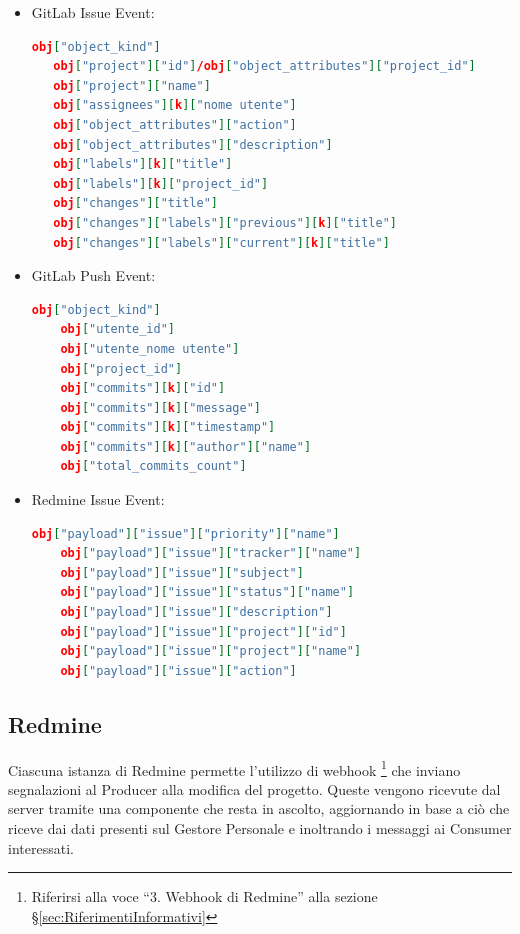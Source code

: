     \begin{itemize}

            \item GitLab Issue Event:
        \begin{lstlisting}[language = json]
   obj["object_kind"]
   obj["project"]["id"]/obj["object_attributes"]["project_id"]
   obj["project"]["name"]
   obj["assignees"][k]["nome utente"]
   obj["object_attributes"]["action"]
   obj["object_attributes"]["description"]
   obj["labels"][k]["title"]
   obj["labels"][k]["project_id"]
   obj["changes"]["title"]
   obj["changes"]["labels"]["previous"][k]["title"]
   obj["changes"]["labels"]["current"][k]["title"]
        \end{lstlisting}

            \item GitLab Push Event:
        \begin{lstlisting}[language = json]
    obj["object_kind"]
    obj["utente_id"]
    obj["utente_nome utente"]
    obj["project_id"]
    obj["commits"][k]["id"]
    obj["commits"][k]["message"]
    obj["commits"][k]["timestamp"]
    obj["commits"][k]["author"]["name"]
    obj["total_commits_count"]
        \end{lstlisting}

            \item Redmine Issue Event:
        \begin{lstlisting}[language = json]
    obj["payload"]["issue"]["priority"]["name"]
    obj["payload"]["issue"]["tracker"]["name"]
    obj["payload"]["issue"]["subject"]
    obj["payload"]["issue"]["status"]["name"]
    obj["payload"]["issue"]["description"]
    obj["payload"]["issue"]["project"]["id"]
    obj["payload"]["issue"]["project"]["name"]
    obj["payload"]["issue"]["action"]
        \end{lstlisting}
    \end{itemize}

		\subsection{Redmine}
		Ciascuna istanza di Redmine permette l'utilizzo di webhook%
        \footnote{Riferirsi alla voce ``3. Webhook di Redmine'' alla sezione \S\ref{sec:RiferimentiInformativi}}
        che inviano segnalazioni al Producer alla modifica del progetto.
        Queste vengono ricevute dal server tramite una componente che resta in ascolto,
        aggiornando in base a ciò che riceve dai dati presenti sul Gestore Personale e inoltrando i messaggi
        ai Consumer interessati.
		
